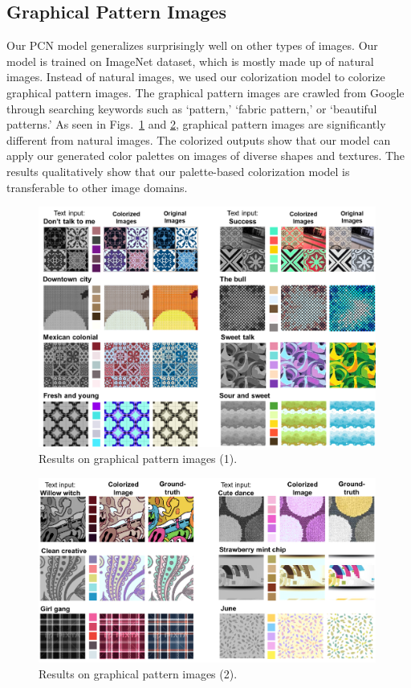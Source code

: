 \documentclass[runningheads]{llncs}
\begin{document}
\subsection{Graphical Pattern Images}
Our PCN model generalizes surprisingly well on other types of images. Our model is trained on ImageNet dataset, which is mostly made up of natural images. Instead of natural images, we used our colorization model to colorize graphical pattern images. The graphical pattern images are crawled from Google through searching keywords such as `pattern,' `fabric pattern,' or `beautiful patterns.' As seen in Figs.~\ref{fig:pattern1} and \ref{fig:pattern2}, graphical pattern images are significantly different from natural images. The colorized outputs show that our model can apply our generated color palettes on images of diverse shapes and textures. The results qualitatively show that our palette-based colorization model is transferable to other image domains. 

\begin{figure}[h!]
\centering 
\includegraphics[width=0.99\textwidth]{./pattern_supp1.png}
\vspace*{-2mm}\caption{Results on graphical pattern images (1).}\label{fig:pattern1}
\end{figure}


\begin{figure}[t!]
\centering 
\includegraphics[width=0.99\textwidth]{./pattern_supp2.png}
\vspace*{-2mm}\caption{Results on graphical pattern images (2).}\label{fig:pattern2}
\vspace*{5in}
\end{figure}

\clearpage
\end{document}

